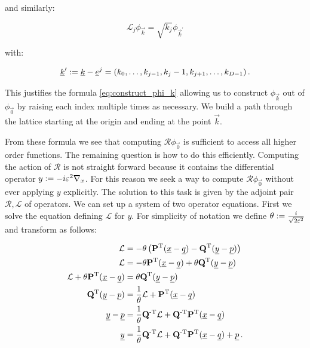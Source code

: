 and similarly:

\begin{equation}
  \mathcal{L}_j \phi_{\vec{k}} = \sqrt{k_j} \phi_{\vec{k}^\prime}
\end{equation}

with:

\begin{equation}
  \underline{k}^\prime := \underline{k} - \underline{e}^j = (k_0, \ldots, k_{j-1}, k_j-1, k_{j+1}, \ldots, k_{D-1}) \,.
\end{equation}

This justifies the formula \eqref{eq:construct_phi_k} allowing us to construct
$\phi_{\vec{k}}$ out of $\phi_{\vec{0}}$ by raising each index multiple times as
necessary. We build a path through the lattice starting at the origin and ending
at the point $\vec{k}$.

From these formula we see that computing $\mathcal{R} \phi_{\vec{0}}$ is sufficient
to access all higher order functions. The remaining question is how to do this
efficiently. Computing the action of $\mathcal{R}$ is not straight forward because
it contains the differential operator $y := -i \varepsilon^2 \nabla_x$. For
this reason we seek a way to compute $\mathcal{R} \phi_{\vec{0}}$ without
ever applying $y$ explicitly. The solution to this task is given by the adjoint
pair $\mathcal{R}, \mathcal{L}$ of operators. We can set up a system of two
operator equations. First we solve the equation defining $\mathcal{L}$ for $y$.
For simplicity of notation we define $\theta := \frac{i}{\sqrt{2\varepsilon^2}}$
and transform as follows:

\begin{align} \label{eq:y_op}
  \mathcal{L} & = -\theta \left( \mathbf{P}{}^{\textnormal{T}} (\underline{x}-\underline{q}) - \mathbf{Q}{}^{\textnormal{T}} (\underline{y}-\underline{p}) \right) \nonumber\\
  \mathcal{L} & = -\theta \mathbf{P}{}^{\textnormal{T}} (\underline{x}-\underline{q}) + \theta \mathbf{Q}{}^{\textnormal{T}} (\underline{y}-\underline{p}) \nonumber\\
  \mathcal{L} + \theta \mathbf{P}{}^{\textnormal{T}} (\underline{x}-\underline{q}) & = \theta \mathbf{Q}{}^{\textnormal{T}} (\underline{y}-\underline{p}) \nonumber\\
  \mathbf{Q}{}^{\textnormal{T}} (\underline{y}-\underline{p}) & = \frac{1}{\theta} \mathcal{L} + \mathbf{P}{}^{\textnormal{T}} (\underline{x}-\underline{q}) \nonumber\\
  \underline{y}-\underline{p} & = \frac{1}{\theta} \mathbf{Q}{}^{\textnormal{-T}} \mathcal{L} + \mathbf{Q}{}^{\textnormal{-T}} \mathbf{P}{}^{\textnormal{T}} (\underline{x}-\underline{q}) \nonumber\\
  \underline{y} & = \frac{1}{\theta} \mathbf{Q}{}^{\textnormal{-T}} \mathcal{L} + \mathbf{Q}{}^{\textnormal{-T}} \mathbf{P}{}^{\textnormal{T}} (\underline{x}-\underline{q}) + \underline{p} \,.
\end{align}

